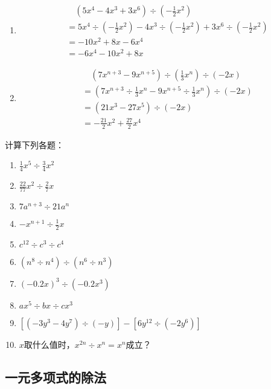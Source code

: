 \begin{solution}
    \begin{enumerate}
        \item \[\begin{split}
            &\quad (5x^4-4x^3+3x^6)\div \left(-\frac{1}{2}x^2\right)\\
            &=  5x^4\div \left(-\frac{1}{2}x^2\right)-4x^3\div \left(-\frac{1}{2}x^2\right)+3x^6 \div \left(-\frac{1}{2}x^2\right)\\
            &=-10x^2+8x-6x^4\\
            &=-6x^4-10x^2+8x   
        \end{split}\]
        \item \[\begin{split}
            &\quad (7x^{n+3}-9x^{n+5})\div \left(\frac{1}{3}x^n\right)\div (-2x)\\
            &=  \left(7x^{n+3} \div\frac{1}{3}x^n-9x^{n+5}\div \frac{1}{3}x^n \right)\div (-2x)\\
            &=(21x^3-27x^5)\div (-2x)\\
            &= -\frac{21}{2}x^2+\frac{27}{2}x^4  
        \end{split}\]
    \end{enumerate}
\end{solution}

\begin{ex}
  计算下列各题：
  \begin{enumerate}
      \item $\frac{1}{4}x^5\div\frac{3}{4}x^2$
      \item $\frac{22}{77}x^2\div\frac{2}{7}x$
      \item $7a^{n+3}\div 21a^n$
      \item $-x^{n+1}\div \frac{1}{2}x$
      \item $c^{12}\div c^3\div c^4$
      \item $(n^8\div n^4)\div (n^6\div n^3)$
      \item $(-0.2x)^3\div (-0.2x^3)$
      \item $ax^5\div bx\div cx^3$
      \item $\left[(-3y^3-4y^7)\div (-y) \right]-\left[6y^{12}\div (-2y^6) \right]$
      \item $x$取什么值时，$x^{2n}\div x^n=x^n$成立？
  \end{enumerate}
  
\end{ex}

\subsection{一元多项式的除法}

